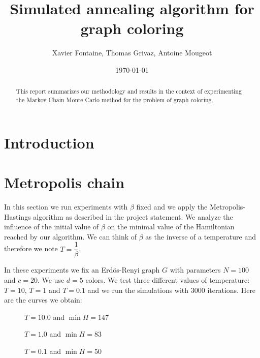 \documentclass[a4paper]{article}
\title{Simulated annealing algorithm for graph coloring}
\author{Xavier Fontaine, Thomas Grivaz, Antoine Mougeot}
\date{\today}
\begin{document}
\maketitle

\begin{abstract}
This report summarizes our methodology and results in the context of experimenting the Markov Chain Monte Carlo method for the problem of graph coloring.
\end{abstract}

\section{Introduction}
\label{sec:introduction}

\section{Metropolis chain}

In this section we run experiments with $\beta$ fixed and we apply the Metropolis-Hastings algorithm as described in the project statement. We analyze the influence of the initial value of $\beta$ on the minimal value of the Hamiltonian reached by our algorithm. We can think of $\beta$ as the inverse of a temperature and therefore we note $T=\dfrac{1}{\beta}$.

In these experiments we fix an Erdös-Renyi graph $G$ with parameters $N=100$ and $c=20$. We use $d=5$ colors. We test three different values of temperature: $T=10$, $T=1$ and $T=0.1$ and we run the simulations with $3000$ iterations. Here are the curves we obtain:

\begin{figure}[H]
 \begin{minipage}[b]{.3\linewidth}
  \centering{}
  \caption{$T=10.0$ and $\min H=147$ \label{fix10}}
 \end{minipage} \hfill
 \begin{minipage}[b]{.3\linewidth}
  \centering{}
  \caption{$T=1.0$ and $\min H=83$ \label{fix1}}
 \end{minipage} \hfill
 \begin{minipage}[b]{.3\linewidth}
  \centering{}
  \caption{$T=0.1$ and $\min H=50$ \label{fix01}}
 \end{minipage}
\end{figure}
\end{document}
